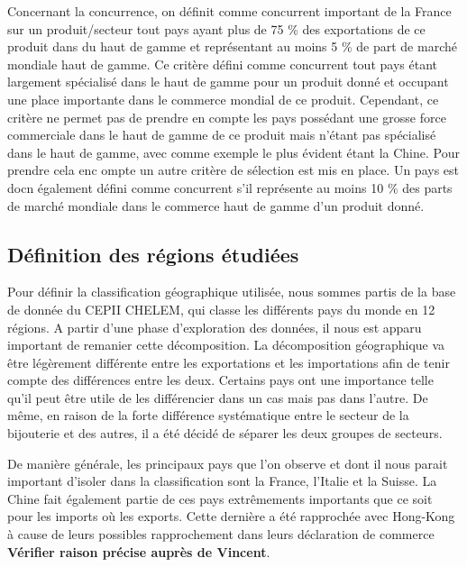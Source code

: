 \documentclass[french,10pt,a4paper]{article}
\begin{document}

Concernant la concurrence, on définit comme concurrent important de la France sur un produit/secteur tout pays ayant plus de 75 \% des exportations de ce produit dans du haut de gamme et représentant au moins 5 \% de part de marché mondiale haut de gamme. Ce critère défini comme concurrent tout pays étant largement spécialisé dans le haut de gamme pour un produit donné et occupant une place importante dans le commerce mondial de ce produit. Cependant, ce critère ne permet pas de prendre en compte les pays possédant une grosse force commerciale dans le haut de gamme de ce produit mais n'étant pas spécialisé dans le haut de gamme, avec comme exemple le plus évident étant la Chine. Pour prendre cela enc ompte un autre critère de sélection est mis en place. Un pays est docn également défini comme concurrent s'il représente au moins 10 \% des parts de marché mondiale dans le commerce haut de gamme d'un produit donné.


\subsection{Définition des régions étudiées}

Pour définir la classification géographique utilisée, nous sommes partis de la base de donnée du CEPII CHELEM, qui classe les différents pays du monde en 12 régions. A partir d'une phase d'exploration des données, il nous est apparu important de remanier cette décomposition. La décomposition géographique va être légèrement différente entre les exportations et les importations afin de tenir compte des différences entre les deux. Certains pays ont une importance telle qu'il peut être utile de les différencier dans un cas mais pas dans l'autre. De même, en raison de la forte différence systématique entre le secteur de la bijouterie et des autres, il a été décidé de séparer les deux groupes de secteurs.

De manière générale, les principaux pays que l'on observe et dont il nous parait important d'isoler dans la classification sont la France, l'Italie et la Suisse. La Chine fait également partie de ces pays extrêmements importants que ce soit pour les imports où les exports. Cette dernière a été rapprochée avec Hong-Kong à cause de leurs possibles rapprochement dans leurs déclaration de commerce \textbf{Vérifier raison précise auprès de Vincent}.
\end{document}
